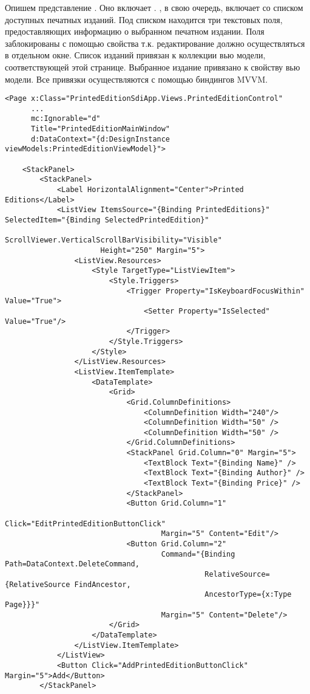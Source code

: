 \documentclass[a4paper,14pt]{extarticle}
\begin{document}
Опишем представление . Оно включает . ,
в свою очередь, включает  со списком доступных печатных изданий. Под списком находится
три текстовых поля, предоставляющих информацию о выбранном печатном издании. Поля заблокированы с помощью
свойства  т.к. редактирование должно осуществляться в отдельном окне. Список изданий
привязан к коллекции вью модели, соответствующей этой странице. Выбранное издание привязано к свойству
вью модели. Все привязки осуществляются с помощью биндингов MVVM.
\begin{lstlisting}
<Page x:Class="PrintedEditionSdiApp.Views.PrintedEditionControl"
      ...
      mc:Ignorable="d"
      Title="PrintedEditionMainWindow"
      d:DataContext="{d:DesignInstance viewModels:PrintedEditionViewModel}">
    
    <StackPanel>
        <StackPanel>
            <Label HorizontalAlignment="Center">Printed Editions</Label>
            <ListView ItemsSource="{Binding PrintedEditions}" SelectedItem="{Binding SelectedPrintedEdition}"
                      ScrollViewer.VerticalScrollBarVisibility="Visible"
                      Height="250" Margin="5">
                <ListView.Resources>
                    <Style TargetType="ListViewItem">
                        <Style.Triggers>
                            <Trigger Property="IsKeyboardFocusWithin" Value="True">
                                <Setter Property="IsSelected" Value="True"/>
                            </Trigger>
                        </Style.Triggers>
                    </Style>
                </ListView.Resources>
                <ListView.ItemTemplate>
                    <DataTemplate>
                        <Grid>
                            <Grid.ColumnDefinitions>
                                <ColumnDefinition Width="240"/>
                                <ColumnDefinition Width="50" />
                                <ColumnDefinition Width="50" />
                            </Grid.ColumnDefinitions>
                            <StackPanel Grid.Column="0" Margin="5">
                                <TextBlock Text="{Binding Name}" />
                                <TextBlock Text="{Binding Author}" />
                                <TextBlock Text="{Binding Price}" />
                            </StackPanel>
                            <Button Grid.Column="1"
                                    Click="EditPrintedEditionButtonClick"
                                    Margin="5" Content="Edit"/>
                            <Button Grid.Column="2"
                                    Command="{Binding Path=DataContext.DeleteCommand,
                                              RelativeSource={RelativeSource FindAncestor,
                                              AncestorType={x:Type Page}}}"
                                    Margin="5" Content="Delete"/>
                        </Grid>
                    </DataTemplate>
                </ListView.ItemTemplate>
            </ListView>
            <Button Click="AddPrintedEditionButtonClick" Margin="5">Add</Button>
        </StackPanel>
        

\end{lstlisting}
\end{document}
